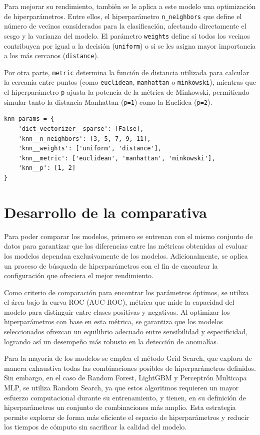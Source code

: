 \documentclass[11pt,a4paper,spanish]{book}
\numberwithin{equation}{chapter}
\numberwithin{figure}{chapter}
\begin{document}
Para mejorar su rendimiento, también se le aplica a este modelo una optimización de 
hiperparámetros. Entre ellos, el hiperparámetro \lstinline|n_neighbors| que define el 
número de vecinos considerados para la clasificación, afectando directamente el sesgo y 
la varianza del modelo. El parámetro \lstinline|weights| define si todos los vecinos 
contribuyen por igual a la decisión (\lstinline|uniform|) o si se les asigna mayor 
importancia a los más cercanos (\lstinline|distance|). 


Por otra parte, \lstinline|metric| 
determina la función de distancia utilizada para calcular la cercanía entre puntos 
(como \lstinline|euclidean|, \lstinline|manhattan| o \lstinline|minkowski|), mientras 
que el hiperparámetro \lstinline|p| ajusta la potencia de la métrica de Minkowski, 
permitiendo simular tanto la distancia Manhattan (\lstinline|p=1|) como la 
Euclídea (\lstinline|p=2|). 


\vspace{5mm}
\begin{lstlisting}
knn_params = {
    'dict_vectorizer__sparse': [False],
    'knn__n_neighbors': [3, 5, 7, 9, 11],     
    'knn__weights': ['uniform', 'distance'],  
    'knn__metric': ['euclidean', 'manhattan', 'minkowski'],  
    'knn__p': [1, 2]  
}
\end{lstlisting}


\section{Desarrollo de la comparativa}


Para poder comparar los modelos, primero se entrenan con el mismo conjunto de datos para 
garantizar que las diferencias entre las métricas obtenidas al evaluar los modelos 
dependan exclusivamente de los modelos. Adicionalmente, se aplica un proceso de búsqueda 
de hiperparámetros con el fin de encontrar la configuración que ofreciera el mejor 
rendimiento. 


Como criterio de comparación para encontrar los parámetros óptimos, se utiliza el área 
bajo la curva ROC (AUC-ROC), métrica que mide la capacidad del modelo para distinguir 
entre clases positivas y negativas. Al optimizar los hiperparámetros con base en esta 
métrica, se garantiza que los modelos seleccionados ofrezcan un equilibrio adecuado 
entre sensibilidad y especificidad, logrando así un desempeño más robusto en la 
detección de anomalías.


Para la mayoría de los modelos se emplea el método Grid Search, que explora de manera 
exhaustiva todas las combinaciones posibles de hiperparámetros definidos. Sin embargo, 
en el caso de Random Forest, LightGBM y Perceptrón Multicapa MLP,  se utiliza Random 
Search, ya que estos algoritmos requieren un mayor esfuerzo computacional durante su 
entrenamiento, y tienen, en su definición de hiperparámetros un conjunto de 
combinaciones más amplio. Esta estrategia permite explorar de forma más eficiente el 
espacio de hiperparámetros y reducir los tiempos de cómputo sin sacrificar la calidad 
del modelo.
\end{document}
